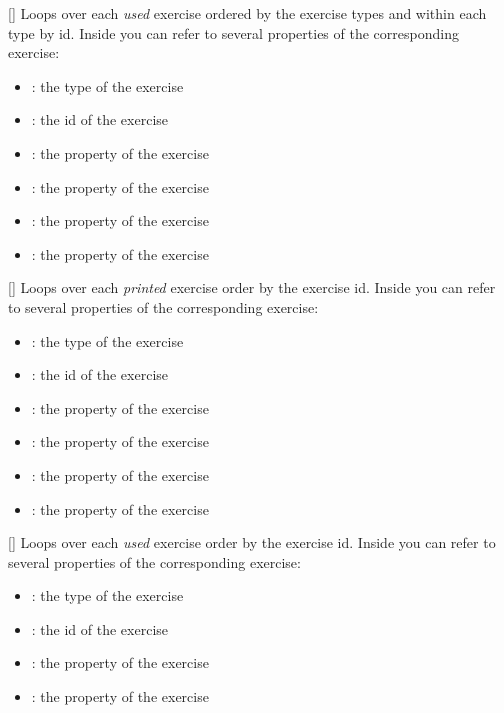 \documentclass{xsim-manual}
\begin{document}
\begin{commands}
  []
    Loops over each \emph{used} exercise ordered by the exercise types and
    within each type by id.  Inside  you can refer to several
    properties of the corresponding exercise:
    \begin{itemize}
      \item {}: the type of the exercise
      \item {}: the id of the exercise
      \item {}: the  property of the exercise
      \item {}: the  property of the exercise
      \item {}: the  property of the exercise
      \item {}: the  property of the exercise
    \end{itemize}
  []
    Loops over each \emph{printed} exercise order by the exercise id.  Inside
     you can refer to several properties of the corresponding
    exercise:
    \begin{itemize}
      \item {}: the type of the exercise
      \item {}: the id of the exercise
      \item {}: the  property of the exercise
      \item {}: the  property of the exercise
      \item {}: the  property of the exercise
      \item {}: the  property of the exercise
    \end{itemize}
  []
    Loops over each \emph{used} exercise order by the exercise id.  Inside
     you can refer to several properties of the corresponding
    exercise:
    \begin{itemize}
      \item {}: the type of the exercise
      \item {}: the id of the exercise
      \item {}: the  property of the exercise
      \item {}: the  property of the exercise

\end{itemize}
\end{commands}
\end{document}
